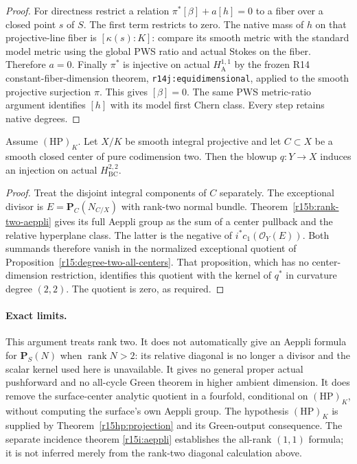 \begin{proof}
For directness restrict a relation
$\pi^*[\beta]+a[h]=0$ to a fiber over a closed point $s$ of
$S$. The first term restricts to zero. The native mass of
$h$ on that projective-line fiber is $[\kappa(s):K]$:
compare its smooth metric with the standard model metric
using the global PWS ratio and actual Stokes on the fiber.
Therefore $a=0$. Finally $\pi^*$ is injective on actual
$H_{\mathrm A}^{1,1}$ by the frozen R14 constant-fiber-dimension
theorem, \texttt{r14j:equidimensional}, applied to the smooth
projective surjection $\pi$. This gives $[\beta]=0$.
The same PWS metric-ratio argument identifies $[h]$ with its
model first Chern class. Every step retains native degrees.
\end{proof}

\begin{corollary}
\label{r15b:codim-two-center}
Assume $(\mathrm{HP})_K$. Let $X/K$ be smooth integral
projective and let $C\subset X$ be a smooth closed center of
pure codimension two. Then the blowup $q:Y\to X$ induces
an injection on actual $H_{\mathrm{BC}}^{2,2}$.
\end{corollary}

\begin{proof}
Treat the disjoint integral components of $C$ separately.
The exceptional divisor is $E=\mathbf P_C(N_{C/X})$ with
rank-two normal bundle. Theorem~\ref{r15b:rank-two-aeppli}
gives its full Aeppli group as the sum of a center pullback
and the relative hyperplane class. The latter is the negative
of $i^*c_1(\mathcal O_Y(E))$. Both summands therefore vanish
in the normalized exceptional quotient of
Proposition~\ref{r15:degree-two-all-centers}. That proposition,
which has no center-dimension restriction, identifies this
quotient with the kernel of $q^*$ in curvature degree $(2,2)$.
The quotient is zero, as required.
\end{proof}

\paragraph{Exact limits.}
This argument treats rank two. It does not automatically give
an Aeppli formula for $\mathbf P_S(N)$ when
$\operatorname{rank}N>2$: its relative diagonal is no longer
a divisor and the scalar kernel used here is unavailable.
It gives no general proper actual pushforward and no all-cycle
Green theorem in higher ambient dimension. It does remove the
surface-center analytic quotient in a fourfold, conditional
on $(\mathrm{HP})_K$, without computing the surface's own
Aeppli group. The hypothesis $(\mathrm{HP})_K$ is supplied
by Theorem~\ref{r15hp:projection} and its Green-output
consequence. The separate incidence theorem
\ref{r15i:aeppli} establishes the all-rank $(1,1)$
formula; it is not inferred merely from the rank-two
diagonal calculation above.

